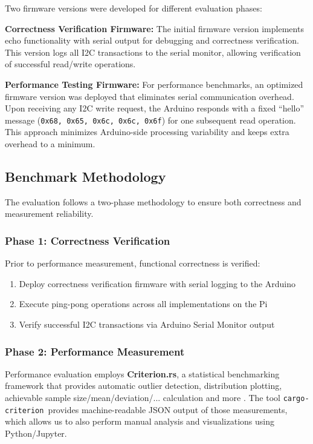Two firmware versions were developed for different evaluation phases:

\textbf{Correctness Verification Firmware:}
The initial firmware version implements echo functionality with serial output for debugging and correctness verification. This version logs all I2C transactions to the serial monitor, allowing verification of successful read/write operations.

\textbf{Performance Testing Firmware:}
For performance benchmarks, an optimized firmware version was deployed that eliminates serial communication overhead. Upon receiving any I2C write request, the Arduino responds with a fixed ``hello'' message (\texttt{0x68, 0x65, 0x6c, 0x6c, 0x6f}) for one subsequent read operation. This approach minimizes Arduino-side processing variability and keeps extra overhead to a minimum.

\subsection{Benchmark Methodology}
\label{subsec:benchmark-methodology}

The evaluation follows a two-phase methodology to ensure both correctness and measurement reliability.

\subsubsection{Phase 1: Correctness Verification}
\label{subsubsec:correctness-verification}

Prior to performance measurement, functional correctness is verified:
\begin{enumerate}
    \item Deploy correctness verification firmware with serial logging to the Arduino
    \item Execute ping-pong operations across all implementations on the Pi
    \item Verify successful I2C transactions via Arduino Serial Monitor output
\end{enumerate}

\subsubsection{Phase 2: Performance Measurement}
\label{subsubsec:performance-measurement}

Performance evaluation employs \textbf{Criterion.rs}, a statistical benchmarking framework that provides automatic outlier detection, distribution plotting, achievable sample size/mean/deviation/... calculation and more \cite{criterion_rs}. The tool \texttt{cargo-criterion }provides machine-readable JSON output of those measurements, which allows us to also perform manual analysis and visualizations using Python/Jupyter.

